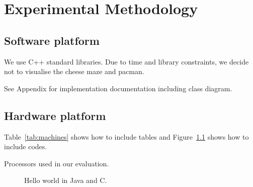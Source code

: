 \chapter{Experimental Methodology}
\label{cha:methodology}

\section{Software platform}
\label{sec:softplat}
We use C++ standard libraries. Due to time and library constraints, we decide not to visualise the cheese maze and pacman. 

See Appendix for implementation documentation including class diagram.


\section{Hardware platform}
\label{sec:hardplat}

Table~\ref{tab:machines} shows how to include tables and Figure~\ref{fig:helloworld} shows how to include codes.
\begin{table*}
  \centering
  
  \caption{Processors used in our evaluation.}
  \label{tab:machines}
\end{table*}



\begin{figure}
  \centering
  \subfigure[\label{fig:c:hello}]{
  \begin{minipage}[b]{\columnwidth}
    \vspace*{-2ex}
  \end{minipage}}
  \subfigure[\label{fig:java:hello}]{
  \begin{minipage}[b]{\columnwidth}
    \vspace*{-2ex}
  \end{minipage}}
  \caption{Hello world in Java and C.}
  \label{fig:helloworld}
\end{figure}




